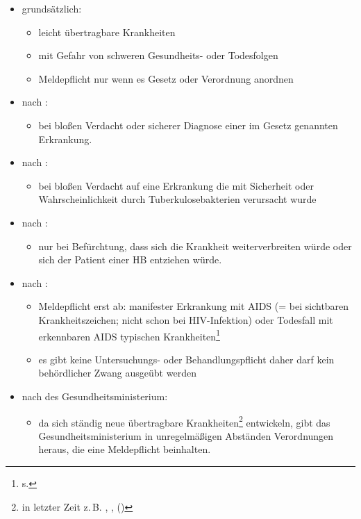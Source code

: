 \begin{itemize}
  \item
  grundsätzlich:
  \begin{itemize}
    \item
    leicht übertragbare Krankheiten
    \item
    mit Gefahr von schweren Gesundheits- oder Todesfolgen
    \item
    Meldepflicht nur wenn es Gesetz oder Verordnung anordnen
  \end{itemize}
  
  \item
  nach :
  
  \begin{itemize}
    \item
    bei bloßen Verdacht oder sicherer Diagnose einer im Gesetz genannten
    Erkrankung.
  \end{itemize}
  \item
  nach :
  \begin{itemize}
    \item
    bei bloßen Verdacht auf eine Erkrankung die mit Sicherheit oder
    Wahrscheinlichkeit durch Tuberkulosebakterien verursacht wurde
  \end{itemize}
  \item
  nach :
  \begin{itemize}
    \item
    nur bei Befürchtung, dass sich die Krankheit	weiterverbreiten würde oder sich der Patient einer
       HB entziehen würde.
  \end{itemize}
  \item
  nach :
  \begin{itemize}
    \item
     Meldepflicht erst ab: manifester
    Erkrankung mit AIDS (= bei sichtbaren Krankheitszeichen;
    nicht schon bei HIV-Infektion) oder Todesfall mit
    erkennbaren AIDS typischen Krankheiten\footnote{s.
    }
    \item
    es gibt keine Untersuchungs- oder Behandlungspflicht daher darf kein
    behördlicher Zwang ausgeübt werden
  \end{itemize}
  \item
  nach  des Gesundheitsministerium:
  \begin{itemize}
    \item da sich ständig neue übertragbare
    Krankheiten\footnote{in letzter Zeit z.\,B.
    , , 
    ()} entwickeln, gibt das
    Gesundheitsministerium in unregelmäßigen  Abständen Verordnungen heraus, die eine Meldepflicht beinhalten.
  \end{itemize}
\end{itemize}

